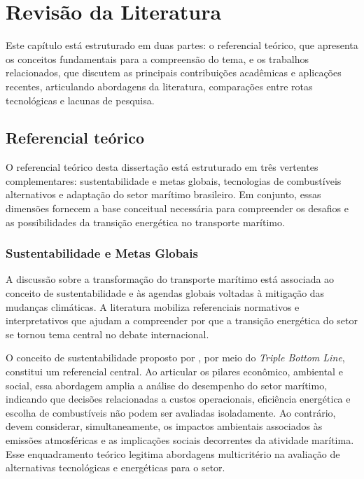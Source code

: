 \chapter{Revisão da Literatura}
\label{chap_referencial}

Este capítulo está estruturado em duas partes: o referencial teórico, que apresenta os conceitos fundamentais para a compreensão do tema, e os trabalhos relacionados, que discutem as principais contribuições acadêmicas e aplicações recentes, articulando abordagens da literatura, comparações entre rotas tecnológicas e lacunas de pesquisa.

\section{Referencial teórico}
O referencial teórico desta dissertação está estruturado em três vertentes complementares: sustentabilidade e metas globais, tecnologias de combustíveis alternativos e adaptação do setor marítimo brasileiro. Em conjunto, essas dimensões fornecem a base conceitual necessária para compreender os desafios e as possibilidades da transição energética no transporte marítimo.

\subsection{Sustentabilidade e Metas Globais}
A discussão sobre a transformação do transporte marítimo está associada ao conceito de sustentabilidade e às agendas globais voltadas à mitigação das mudanças climáticas. A literatura mobiliza referenciais normativos e interpretativos que ajudam a compreender por que a transição energética do setor se tornou tema central no debate internacional.

O conceito de sustentabilidade proposto por \citet{elkington_cannibals_1998}, por meio do \emph{Triple Bottom Line}, constitui um referencial central. Ao articular os pilares econômico, ambiental e social, essa abordagem amplia a análise do desempenho do setor marítimo, indicando que decisões relacionadas a custos operacionais, eficiência energética e escolha de combustíveis não podem ser avaliadas isoladamente. Ao contrário, devem considerar, simultaneamente, os impactos ambientais associados às emissões atmosféricas e as implicações sociais decorrentes da atividade marítima. Esse enquadramento teórico legitima abordagens multicritério na avaliação de alternativas tecnológicas e energéticas para o setor.

